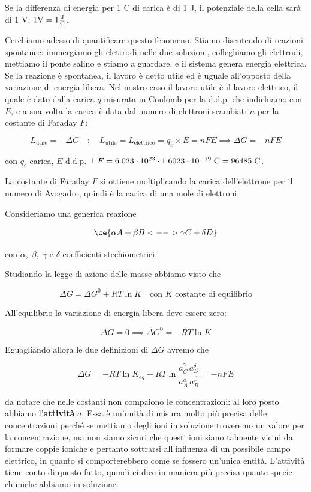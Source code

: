 Se la differenza di energia per 1 C di carica è di 1 J, il potenziale della cella sarà di 1 V: $\rm 1 V=1\frac{J}{C}$.

Cerchiamo adesso di quantificare questo fenomeno. Stiamo discutendo di reazioni spontanee: immergiamo gli elettrodi nelle due soluzioni, colleghiamo gli elettrodi, mettiamo il ponte salino e stiamo a guardare, e il sistema genera energia elettrica. Se la reazione è spontanea, il lavoro è detto utile ed è uguale all'opposto della variazione di energia libera. Nel nostro caso il lavoro utile è il lavoro elettrico, il quale è dato dalla carica $q$ misurata in Coulomb per la d.d.p. che indichiamo con $E$, e a sua volta la carica è data dal numero di elettroni scambiati $n$ per la costante di Faraday $F$:

$$L_{\text{utile}}=- \Delta G
\quad;\quad
L_{\text{utile}}=L_{\text{elettrico}}=q_c \times E=nFE \implies \Delta G = -nFE$$

con $q_c$ carica, $E$ d.d.p.\, $1 \; F=\rm 6.023 \cdot 10^{23} \cdot 1.6023 \cdot 10^{-19} \; C = 96485 \; C$.

La costante di Faraday $F$ si ottiene moltiplicando la carica dell'elettrone per il numero di Avogadro, quindi è la carica di una mole di elettroni.

Consideriamo una generica reazione

$$\ce{\alpha A + \beta B <--> \gamma C + \delta D}$$

con $\alpha, \; \beta, \; \gamma$ e $\delta$ coefficienti stechiometrici.

Studiando la legge di azione delle masse abbiamo visto che

$$\Delta G = \Delta G^0 + RT\ln K \quad \text{con } K \text{ costante di equilibrio}$$

All'equilibrio la variazione di energia libera deve essere zero:

$$\Delta G=0 \implies \Delta G^0= -RT \ln K$$

Eguagliando allora le due definizioni di $\Delta G$ avremo che

$$\Delta G = -RT \ln K_{eq} + RT \ln \frac{a_C^{\gamma} \, a_D^{\delta}}{a_A^{\alpha} \, a_B^{\beta}}=-nFE$$

\E da notare che nelle costanti non compaiono le concentrazioni: al loro posto abbiamo l'\textbf{attività} $a$. Essa è un'unità di misura molto più precisa delle concentrazioni perché se mettiamo degli ioni in soluzione troveremo un valore per la concentrazione, ma non siamo sicuri che questi ioni siano talmente vicini da formare coppie ioniche e pertanto sottrarsi all'influenza di un possibile campo elettrico, in quanto si comporterebbero come se fossero un'unica entità. L'attività tiene conto di questo fatto, quindi ci dice in maniera più precisa quante specie chimiche abbiamo in soluzione.

